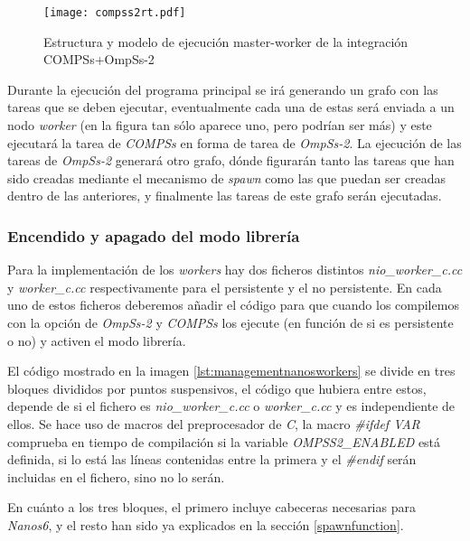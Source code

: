 \begin{figure}[H]
    \centering 
    \caption{Estructura y modelo de ejecución master-worker de la integración COMPSs+OmpSs-2}
    \texttt{[image: compss2rt.pdf]}
    \label{fig:compssompssrt}
\end{figure}

Durante la ejecución del programa principal se irá generando un grafo con las tareas que se deben ejecutar, eventualmente cada una de estas será enviada a un nodo \textit{worker} (en la figura tan sólo aparece uno, pero podrían ser más) y este ejecutará la tarea de \textit{COMPSs} en forma de tarea de \textit{OmpSs-2}.
La ejecución de las tareas de \textit{OmpSs-2} generará otro grafo, dónde figurarán tanto las tareas que han sido creadas mediante el mecanismo de \textit{spawn} como las que puedan ser creadas dentro de las anteriores, y finalmente las tareas de este grafo serán ejecutadas.

\subsubsection{Encendido y apagado del modo librería}

Para la implementación de los \textit{workers} hay dos ficheros distintos \textit{nio\_worker\_c.cc} y \textit{worker\_c.cc} respectivamente para el persistente y el no persistente. En cada uno de estos ficheros deberemos añadir el código para que cuando los compilemos con la opción de \textit{OmpSs-2} y \textit{COMPSs} los ejecute (en función de si es persistente o no) y activen el modo librería.
\bigskip

El código mostrado en la imagen \ref{lst:managementnanosworkers} se divide en tres bloques divididos por puntos suspensivos, el código que hubiera entre estos, depende de si el fichero es \textit{nio\_worker\_c.cc} o \textit{worker\_c.cc} y es independiente de ellos. Se hace uso de macros del preprocesador de \textit{C}, la macro \textit{\#ifdef VAR} comprueba en tiempo de compilación si la variable \textit{OMPSS2\_ENABLED} está definida, si lo está las líneas contenidas entre la primera y el \textit{\#endif} serán incluidas en el fichero, sino no lo serán.
\par\medskip

En cuánto a los tres bloques, el primero incluye cabeceras necesarias para \textit{Nanos6}, y el resto han sido ya explicados en la sección \ref{spawnfunction}.

